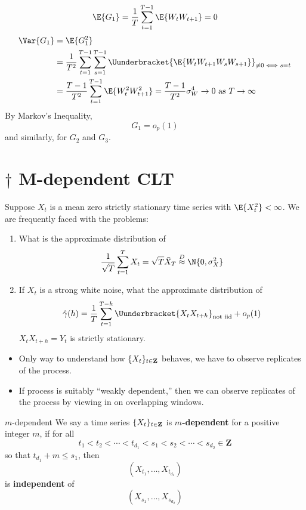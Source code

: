 \begin{Example}{}{}
    \[ \E{G_{1}}=\frac{1}{T} \sum_{t=1}^{T-1} \E{W_{t}W_{t+1}}=0 \]
    \begin{align*}
        \Var{G_{1}}
         & =\E{G_{1}^2}                                                                                                \\
         & =\frac{1}{T^2}\sum_{t=1}^{T-1} \sum_{s=1}^{T-1}\Uunderbracket{\E{W_{t}W_{t+1}W_{s}W_{s+1}}}_{\ne 0\iff s=t} \\
         & =\frac{T-1}{T^2} \sum_{t=1}^{T-1} \E{W_{t}^2W_{t+1}^2}=\frac{T-1}{T^2} \sigma_W^4\to 0\text{ as }T\to\infty
    \end{align*}
    By Markov's Inequality,
    \[ G_{1}=o_p(1) \]
    and similarly, for $ G_{2} $ and $ G_{3} $.
\end{Example}
\section{\texorpdfstring{$ \dagger $}{†} M-dependent CLT}
Suppose $ X_t $ is a mean zero strictly stationary time series
with $ \E{X_t^2}<\infty $. We are frequently faced
with the problems:
\begin{enumerate}[(1)]
    \item What is the approximate distribution of
          \[ \frac{1}{\sqrt{T}} \sum_{t=1}^{T} X_t=\sqrt{T}\bar{X}_T\stackrel{D}{\approx}\N{0,\sigma_X^2} \]
    \item If $ X_t $ is a strong white noise, what the approximate distribution of
          \[ \hat{\gamma}(h)=\frac{1}{T} \sum_{t=1}^{T-h}\Uunderbracket{X_t X_{t+h}}_{\text{not iid}}+o_p(1) \]
          $ X_t X_{t+h}=Y_{t} $ is strictly stationary.
\end{enumerate}
\begin{itemize}
    \item Only way to understand how $ \{X_t\}_{t\in\mathbf{Z}} $ behaves,
          we have to observe replicates of the process.
    \item If process is suitably ``weakly dependent,'' then we can observe
          replicates of the process by viewing in on overlapping windows.
\end{itemize}
\begin{Definition}{$ m $-dependent}{}
    We say a time series $ \{X_t\}_{t\in\mathbf{Z}} $ is $ m $\textbf{-dependent}
    for a positive integer $ m $, if for all
    \[ t_1<t_2<\cdots<t_{d_1}<s_1<s_2<\cdots<s_{d_2}\in\mathbf{Z} \]
    so that $ t_{d_1}+m\le s_1 $, then
    \[ (X_{t_1},\ldots,X_{t_{d_1}}) \]
    is \textbf{independent} of
    \[ (X_{s_1},\ldots,X_{s_{d_2}}) \]
\end{Definition}
